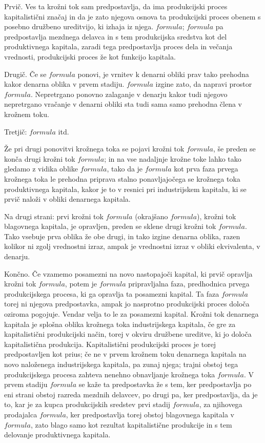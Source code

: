 \documentclass[a5paper]{scrbook}
\begin{document}
Prvič. Ves ta krožni tok sam predpostavlja, da ima produkcijski proces kapitalistični značaj in da je zato njegova osnova ta produkcijski proces obenem s posebno družbeno ureditvijo, ki izhaja iz njega. \( formula \); \( formula \) pa predpostavlja mezdnega delavca in s tem produkcijska sredstva kot del produktivnega kapitala, zaradi tega predpostavlja proces dela in večanja vrednosti, produkcijski proces že kot funkcijo kapitala.

Drugič. Če se \( formula \) ponovi, je vrnitev k denarni obliki prav tako prehodna kakor denarna oblika v prvem stadiju. \( formula \) izgine zato, da napravi prostor \( formula \). Nepretrgano ponovno zalaganje v denarju kakor tudi njegovo nepretrgano vračanje v denarni obliki sta tudi sama samo prehodna člena v krožnem toku.

Tretjič: \( formula \) itd.

Že pri drugi ponovitvi krožnega toka se pojavi krožni tok \( formula \), še preden se konča drugi krožni tok \( formula \); in na vse nadaljnje krožne toke lahko tako gledamo z vidika oblike \( formula \), tako da je \( formula \) kot prva faza prvega krožnega toka le prehodna priprava stalno ponavljajočega se krožnega toka produktivnega kapitala, kakor je to v resnici pri industrijskem kapitalu, ki se prvič naloži v obliki denarnega kapitala.

Na drugi strani: prvi krožni tok \( formula \) (okrajšano \( formula \)), krožni tok blagovnega kapitala, je opravljen, preden se sklene drugi krožni tok \( formula \). Tako vsebuje prva oblika že obe drugi, in tako izgine denarna oblika, razen kolikor ni zgolj vrednostni izraz, ampak je vrednostni izraz v obliki ekvivalenta, v denarju.

Končno. Če vzamemo posamezni na novo nastopajoči kapital, ki prvič opravlja krožni tok \( formula \), potem je \( formula \) pripravljalna faza, predhodnica prvega produkcijskega procesa, ki ga opravlja ta posamezni kapital. Ta faza \( formula \) torej ni njegova predpostavka, ampak jo nasprotno produkcijski proces določa oziroma pogojuje. Vendar velja to le za posamezni kapital. Krožni tok denarnega kapitala je splošna oblika krožnega toka industrijskega kapitala, če gre za kapitalistični produkcijski način, torej v okviru družbene ureditve, ki jo določa kapitalistična produkcija. Kapitalistični produkcijski proces je torej predpostavljen kot prius; če ne v prvem krožnem toku denarnega kapitala na novo naloženega industrijskega kapitala, pa zunaj njega; trajni obstoj tega produkcijskega procesa zahteva nenehno obnavljanje krožnega toka \( formula \). V prvem stadiju \( formula \) se kaže ta predpostavka že s tem, ker predpostavlja po eni strani obstoj razreda mezdnih delavcev, po drugi pa, ker predpostavlja, da je to, kar je za kupca produkcijskih sredstev prvi stadij \( formula \), za njihovega prodajalca \( formula \), ker predpostavlja torej obstoj blagovnega kapitala v \( formula \), zato blago samo kot rezultat kapitalistične produkcije in s tem delovanje produktivnega kapitala.
\end{document}
